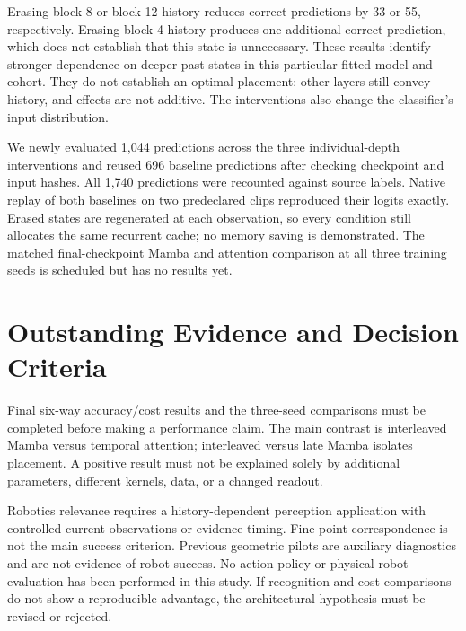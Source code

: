 \documentclass[letterpaper,10pt,conference]{ieeeconf}
\begin{document}
\begin{table}[t]
\centering\small
\caption{State-only intervention at 4,000 updates on 348 videos.
Every adapter still executes. Original-history and all-state-reset
baselines reuse the preceding diagnostic. Differences are in percentage
points relative to original history.}

\end{table}
Erasing block-8 or block-12 history reduces correct predictions by 33 or
55, respectively. Erasing block-4 history produces one additional correct
prediction, which does not establish that this state is unnecessary.
These results identify stronger dependence on deeper past states in this
particular fitted model and cohort. They do not establish an optimal
placement: other layers still convey history, and effects are not additive.
The interventions also change the classifier's input distribution.

We newly evaluated 1,044 predictions across the three individual-depth
interventions and reused 696 baseline predictions after checking checkpoint
and input hashes. All 1,740 predictions were recounted against source labels.
Native replay of both baselines on two predeclared clips reproduced their
logits exactly. Erased states are regenerated at each observation, so every
condition still allocates the same recurrent cache; no memory saving is
demonstrated. The matched final-checkpoint Mamba and attention comparison
at all three training seeds is scheduled but has no results yet.

\section{Outstanding Evidence and Decision Criteria}
Final six-way accuracy/cost results and the three-seed comparisons must be
completed before making a performance claim. The main contrast is
interleaved Mamba versus temporal attention; interleaved versus late Mamba
isolates placement. A positive result must not be explained solely by
additional parameters, different kernels, data, or a changed readout.

Robotics relevance requires a history-dependent perception application
with controlled current observations or evidence timing. Fine point
correspondence is not the main success criterion. Previous geometric
pilots are auxiliary diagnostics and are not evidence of robot success.
No action policy or physical robot evaluation has been performed in this
study. If recognition and cost comparisons do not show a reproducible
advantage, the architectural hypothesis must be revised or rejected.
\end{document}
